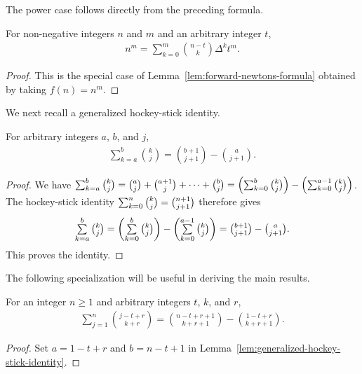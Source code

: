 The power case follows directly from the preceding formula.
\begin{lemma}
  \label{lem:forward-newtons-formula-for-powers}
  For non-negative integers $n$ and $m$ and an arbitrary integer $t$,
  \begin{align*}
    n^m = \sum_{k=0}^{m} \binom{n-t}{k} \Delta^{k} t^m.
  \end{align*}
  \begin{proof}
    This is the special case of Lemma~\eqref{lem:forward-newtons-formula} obtained by taking $f(n)=n^m$.
  \end{proof}
\end{lemma}

We next recall a generalized hockey-stick identity.
\begin{lemma}
  \label{lem:generalized-hockey-stick-identity}
  For arbitrary integers $a$, $b$, and $j$,
  \begin{align*}
    \sum_{k=a}^{b} \binom{k}{j} = \binom{b+1}{j+1} - \binom{a}{j+1}.
  \end{align*}
  \begin{proof}
    We have
    $\mathop{\textstyle\sum}_{k=a}^{b} \tbinom{k}{j}
    = \tbinom{a}{j} + \tbinom{a+1}{j} + \cdots + \tbinom{b}{j}
    = \left( \mathop{\textstyle\sum}_{k=0}^{b} \tbinom{k}{j} \right) - \left( \mathop{\textstyle\sum}_{k=0}^{a-1} \tbinom{k}{j} \right)$.
    The hockey-stick identity $\mathop{\textstyle\sum}_{k=0}^{n} \tbinom{k}{j} = \tbinom{n+1}{j+1}$ therefore gives
    \begin{align*}
      \mathop{\textstyle\sum}_{k=a}^{b} \tbinom{k}{j}
      = \left( \mathop{\textstyle\sum}_{k=0}^{b} \tbinom{k}{j} \right) - \left( \mathop{\textstyle\sum}_{k=0}^{a-1} \tbinom{k}{j} \right)
      = \tbinom{b+1}{j+1} - \tbinom{a}{j+1}.
    \end{align*}
    This proves the identity.
  \end{proof}
\end{lemma}

The following specialization will be useful in deriving the main results.
\begin{lemma}
  \label{lem:forward-hockey-stick-identity}
  For an integer $n\geq1$ and arbitrary integers $t$, $k$, and $r$,
  \begin{align*}
    \sum_{j=1}^{n} \binom{j-t+r}{k+r}
    = \binom{n-t+r+1}{k+r+1} - \binom{1-t+r}{k+r+1}.
  \end{align*}
  \begin{proof}
    Set $a=1-t+r$ and $b=n-t+1$ in Lemma~\eqref{lem:generalized-hockey-stick-identity}.
  \end{proof}
\end{lemma}

